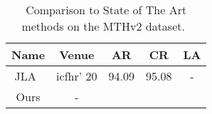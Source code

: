 \begin{table}[]
    \centering
    \caption{Comparison to State of The Art methods on the MTHv2 dataset.~\cite{jla}}

    \begin{tabular}{c|c|ccc}
        \hline
         Name & Venue & AR & \textbf{CR} & LA \\
         \hline
         JLA~\cite{jla}& icfhr' 20&94.09 & 95.08 & -\\
         \hline
         Ours&-&&&\\
        \hline
    \end{tabular}
    \label{tab:my_label}
\end{table}